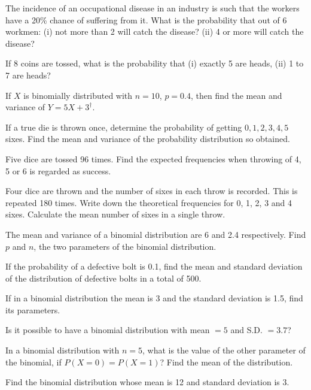 \documentclass[11pt,a4paper]{article}
\begin{document}
\begin{longlist}
\item The incidence of an occupational disease in an industry is such that the workers have a 20\% chance of suffering from it. What is the probability that out of 6 workmen: (i) not more than 2 will catch the disease? (ii) 4 or more will catch the disease?

\item If 8 coins are tossed, what is the probability that (i) exactly 5 are heads, (ii) 1 to 7 are heads?

\item If $X$ is binomially distributed with $n=10$, $p=0.4$, then find the mean and variance of $Y=5X+3^\dagger$.

\item If a true die is thrown once, determine the probability of getting $0,1,2,3,4,5$ sixes. Find the mean and variance of the probability distribution so obtained.

\item Five dice are tossed 96 times. Find the expected frequencies when throwing of 4, 5 or 6 is regarded as success.

\item Four dice are thrown and the number of sixes in each throw is recorded. This is repeated 180 times. Write down the theoretical frequencies for 0, 1, 2, 3 and 4 sixes. Calculate the mean number of sixes in a single throw.

\item The mean and variance of a binomial distribution are 6 and 2.4 respectively. Find $p$ and $n$, the two parameters of the binomial distribution.

\item If the probability of a defective bolt is 0.1, find the mean and standard deviation of the distribution of defective bolts in a total of 500.

\item If in a binomial distribution the mean is 3 and the standard deviation is 1.5, find its parameters.

\item Is it possible to have a binomial distribution with mean $=5$ and S.D. $=3.7$?

\item In a binomial distribution with $n=5$, what is the value of the other parameter of the binomial, if $P(X=0)=P(X=1)$? Find the mean of the distribution.

\item Find the binomial distribution whose mean is 12 and standard deviation is 3.


\end{longlist}
\end{document}

